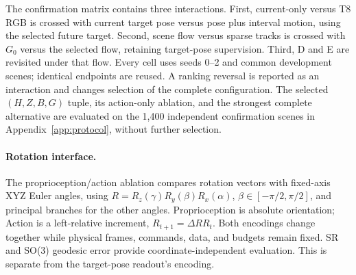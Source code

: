 

The confirmation matrix contains three interactions. First, current-only
versus T8 RGB is crossed with current target pose versus pose plus interval
motion, using the selected future target. Second, scene flow versus sparse
tracks is crossed with $G_0$ versus the selected flow, retaining target-pose
supervision. Third, D and E are revisited under that flow. Every cell uses
seeds 0--2 and common development scenes; identical endpoints are reused.
A ranking reversal is reported as an interaction and changes selection of
the complete configuration. The selected $(H,Z,B,G)$ tuple, its action-only
ablation, and the strongest complete alternative are evaluated on the
1,400 independent confirmation scenes in Appendix~\ref{app:protocol},
without further selection.



\paragraph{Rotation interface.}
The proprioception/action ablation compares rotation vectors with fixed-axis
XYZ Euler angles, using
$R=R_z(\gamma)R_y(\beta)R_x(\alpha)$,
$\beta\in[-\pi/2,\pi/2]$, and principal branches for the other angles.
Proprioception is absolute orientation; Action is a left-relative increment,
$R_{t+1}=\Delta R R_t$. Both encodings change together while physical frames,
commands, data, and budgets remain fixed. SR and SO(3) geodesic error provide
coordinate-independent evaluation. This is separate from the target-pose
readout's encoding.
